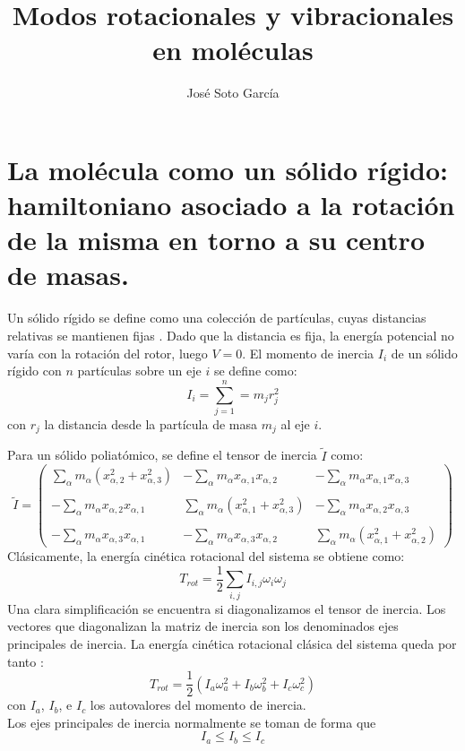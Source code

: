 \documentclass[a4paper]{article}
\title{Modos rotacionales y vibracionales en moléculas}
\author{José Soto García}
\begin{document}
\maketitle
\section{La molécula como un sólido rígido: hamiltoniano asociado a la rotación de la misma en torno a su centro de masas.}
Un sólido rígido se define como una colección de partículas, cuyas distancias relativas se mantienen fijas \cite{marion2013}. Dado que la distancia es fija, la energía potencial no varía con la rotación del rotor, luego $V=0$. El momento de inercia $I_i$ de un sólido rígido con $n$ partículas sobre un eje $i$ se define como:
\begin{equation}
I_i= \sum_{j=1}^n=m_jr_j^2
\end{equation}
con $r_j$ la distancia desde la partícula de masa $m_j$ al eje $i$.

Para un sólido poliatómico, se define el tensor de inercia $\tilde{I}$ como:
\begin{equation}
\tilde{I}=\begin{pmatrix}
\sum_{\alpha}m_{\alpha}\left(x^2_{\alpha,2}+x^2_{\alpha,3}\right) & -\sum_{\alpha}m_{\alpha}x_{\alpha,1}x_{\alpha,2} & -\sum_{\alpha}m_{\alpha}x_{\alpha,1}x_{\alpha,3} \\\\
-\sum_{\alpha}m_{\alpha}x_{\alpha,2}x_{\alpha,1} & \sum_{\alpha}m_{\alpha}\left(x^2_{\alpha,1}+x^2_{\alpha,3}\right) &-\sum_{\alpha}m_{\alpha}x_{\alpha,2}x_{\alpha,3} \\\\
-\sum_{\alpha}m_{\alpha}x_{\alpha,3}x_{\alpha,1} & -\sum_{\alpha}m_{\alpha}x_{\alpha,3}x_{\alpha,2} & \sum_{\alpha}m_{\alpha}\left(x^2_{\alpha,1}+x^2_{\alpha,2}\right) \end{pmatrix}
\end{equation}
Clásicamente, la energía cinética rotacional del sistema se obtiene como:
\begin{equation}
T_{rot}=\frac{1}{2}\sum_{i,j}I_{i,j}\omega_i\omega_j
\end{equation}
Una clara simplificación se encuentra si diagonalizamos el tensor de inercia. Los vectores que diagonalizan la matriz de inercia son los denominados ejes principales de inercia. La energía cinética rotacional clásica del sistema queda por tanto \cite{marion2013}:
\begin{equation}
T_{rot}=\frac{1}{2}\left(I_a\omega^2_a + I_b\omega^2_b + I_c\omega^2_c\right) 
\end{equation}
con $I_a$, $I_b$, e $I_c$ los autovalores del momento de inercia.\\
Los ejes principales de inercia normalmente se toman de forma que
\begin{equation}
I_a \leq I_b \leq I_c
\end{equation}
\end{document}
